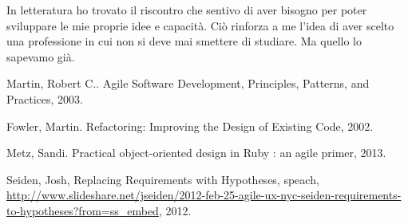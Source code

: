 \documentclass[12pt]{report}
\begin{document}
In letteratura ho trovato il riscontro che sentivo di aver bisogno per
poter sviluppare le mie proprie idee e capacità. Ciò rinforza a me
l'idea di aver scelto una professione in cui non si deve mai smettere
di studiare. Ma quello lo sapevamo già.
%

%
%
\begin{thebibliography}{00}
%
Martin, Robert C.. Agile Software Development, Principles, Patterns,
and Practices, 2003.

Fowler, Martin. Refactoring: Improving the Design of Existing Code, 2002.

Metz, Sandi. Practical object-oriented design in Ruby : an agile primer, 2013.

Seiden, Josh, Replacing Requirements with Hypotheses, speach,
\url{http://www.slideshare.net/jseiden/2012-feb-25-agile-ux-nyc-seiden-requirements-to-hypotheses?from=ss_embed}, 2012.

\end{thebibliography}
% 
\end{document}
